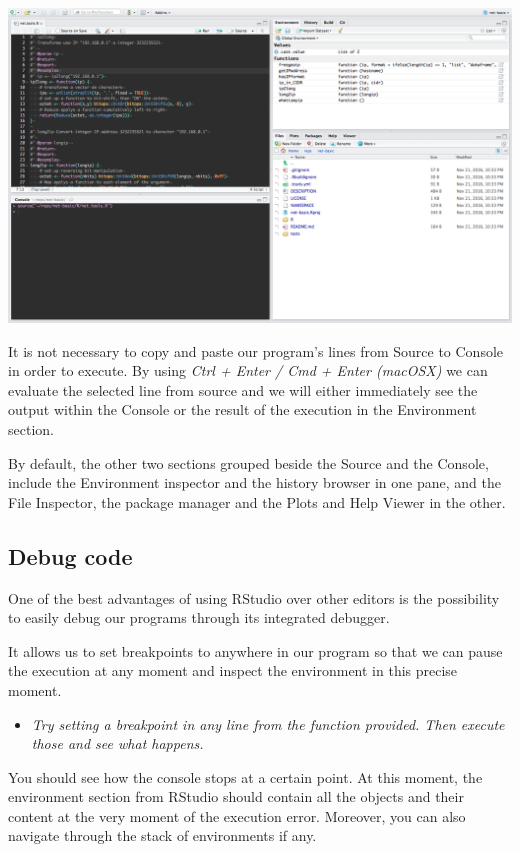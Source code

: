 \documentclass[]{article}
\providecommand{\tightlist}{%
  \setlength{\itemsep}{0pt}\setlength{\parskip}{0pt}}
\begin{document}
\begin{center}\includegraphics[width=600px]{figures/rstudio_layout} \end{center}

It is not necessary to copy and paste our program's lines from Source to
Console in order to execute. By using \emph{Ctrl + Enter / Cmd + Enter
(macOSX)} we can evaluate the selected line from source and we will
either immediately see the output within the Console or the result of
the execution in the Environment section.

By default, the other two sections grouped beside the Source and the
Console, include the Environment inspector and the history browser in
one pane, and the File Inspector, the package manager and the Plots and
Help Viewer in the other.

\subsection{Debug code}\label{debug-code}

One of the best advantages of using RStudio over other editors is the
possibility to easily debug our programs through its integrated
debugger.

It allows us to set breakpoints to anywhere in our program so that we
can pause the execution at any moment and inspect the environment in
this precise moment.

\begin{itemize}
\tightlist
\item
  \emph{Try setting a breakpoint in any line from the function provided.
  Then execute those and see what happens.}
\end{itemize}

You should see how the console stops at a certain point. At this moment,
the environment section from RStudio should contain all the objects and
their content at the very moment of the execution error. Moreover, you
can also navigate through the stack of environments if any.
\end{document}
